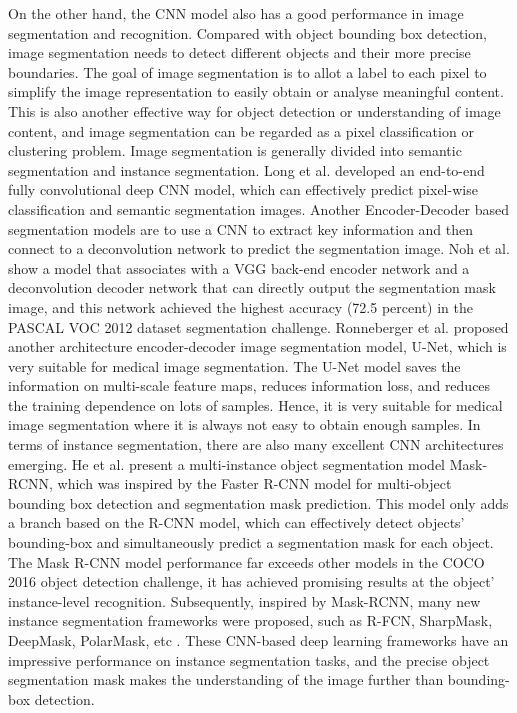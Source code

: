 \documentclass[10pt, a4paper]{article}
\begin{document}
\begin{multicols}{2}
	On the other hand, the CNN model also has a good performance in image segmentation and recognition. Compared with object bounding box detection, image segmentation needs to detect different objects and their more precise boundaries. The goal of image segmentation is to allot a label to each pixel to simplify the image representation to easily obtain or analyse meaningful content. This is also another effective way for object detection or understanding of image content, and image segmentation can be regarded as a pixel classification or clustering problem. Image segmentation is generally divided into semantic segmentation and instance segmentation. Long et al. \cite{long2015fully}  developed an end-to-end fully convolutional deep CNN model, which can effectively predict pixel-wise classification and semantic segmentation images. Another Encoder-Decoder based segmentation models are to use a CNN to extract key information and then connect to a deconvolution network to predict the segmentation image. Noh et al. \cite{noh2015learning} show a model that associates with a VGG back-end encoder network and a deconvolution decoder network that can directly output the segmentation mask image, and this network achieved the highest accuracy (72.5 percent) in the PASCAL VOC 2012 dataset segmentation challenge. Ronneberger et al. \cite{ronneberger2015u} proposed another architecture encoder-decoder image segmentation model, U-Net, which is very suitable for medical image segmentation. The U-Net model saves the information on multi-scale feature maps, reduces information loss, and reduces the training dependence on lots of samples. Hence, it is very suitable for medical image segmentation where it is always not easy to obtain enough samples. In terms of instance segmentation, there are also many excellent CNN architectures emerging. He et al. \cite{he2017mask} present a multi-instance object segmentation model Mask-RCNN, which was inspired by the Faster R-CNN model for multi-object bounding box detection and segmentation mask prediction. This model only adds a branch based on the R-CNN model, which can effectively detect objects’ bounding-box and simultaneously predict a segmentation mask for each object. The Mask R-CNN model performance far exceeds other models in the COCO 2016 object detection challenge, it has achieved promising results at the object’ instance-level recognition. Subsequently, inspired by Mask-RCNN, many new instance segmentation frameworks were proposed, such as R-FCN, SharpMask, DeepMask, PolarMask, etc \cite{minaee2020image}. These CNN-based deep learning frameworks have an impressive performance on instance segmentation tasks, and the precise object segmentation mask makes the understanding of the image further than bounding-box detection.



\end{multicols}
\end{document}
